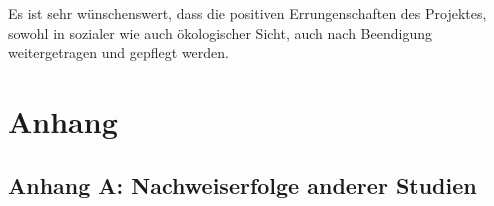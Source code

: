 \documentclass[
  oneside]{scrbook}
\begin{document}
Es ist sehr wünschenswert, dass die positiven Errungenschaften des Projektes, sowohl in sozialer wie auch ökologischer Sicht, auch nach Beendigung weitergetragen und gepflegt werden.

\hypertarget{anhang}{%
\chapter{Anhang}\label{anhang}}

\hypertarget{anhang-zusammenstellung}{%
\section{Anhang A: Nachweiserfolge anderer Studien}\label{anhang-zusammenstellung}}

\begin{table}[H]


\end{table}
\end{document}
